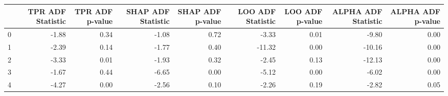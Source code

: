 \begin{tabular}{lrrrrrrrr}
\toprule
 & TPR ADF Statistic & TPR ADF p-value & SHAP ADF Statistic & SHAP ADF p-value & LOO ADF Statistic & LOO ADF p-value & ALPHA ADF Statistic & ALPHA ADF p-value \\
\midrule
0 & -1.88 & 0.34 & -1.08 & 0.72 & -3.33 & 0.01 & -9.80 & 0.00 \\
1 & -2.39 & 0.14 & -1.77 & 0.40 & -11.32 & 0.00 & -10.16 & 0.00 \\
2 & -3.33 & 0.01 & -1.93 & 0.32 & -2.45 & 0.13 & -12.13 & 0.00 \\
3 & -1.67 & 0.44 & -6.65 & 0.00 & -5.12 & 0.00 & -6.02 & 0.00 \\
4 & -4.27 & 0.00 & -2.56 & 0.10 & -2.26 & 0.19 & -2.82 & 0.05 \\
\bottomrule
\end{tabular}
